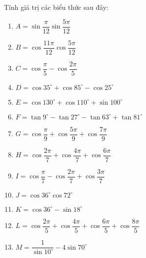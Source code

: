 \begin{bt}%
	Tính giá trị các biểu thức sau đây:
	\begin{multicols}{2}
		\begin{enumerate}
			\item $A=\sin \dfrac{\pi}{12}\sin \dfrac{5\pi}{12}$
			\item $B=\cos \dfrac{11\pi}{12}\cos \dfrac{5\pi}{12}$
			\item $C=\cos \dfrac{\pi}{5}-\cos \dfrac{2\pi}{5}$
			\item $D=\cos 35^\circ+\cos 85^\circ-\cos 25^\circ$
			\item $E=\cos 130^\circ+\cos 110^\circ+\sin 100^\circ$
			\item $F=\tan 9^\circ-\tan 27^\circ-\tan 63^\circ+\tan 81^\circ$
			\item $G=\cos \dfrac{\pi}{9}+\cos \dfrac{5\pi}{9}+\cos \dfrac{7\pi}{9}$
			\item $H=\cos \dfrac{2\pi}{7}+\cos \dfrac{4\pi}{7}+\cos \dfrac{6\pi}{7}$
			\item $I=\cos \dfrac{\pi}{7}-\cos \dfrac{2\pi}{7}+\cos \dfrac{3\pi}{7}$
			\item $J=\cos 36^\circ\cos 72^\circ$
			\item $K=\cos 36^\circ-\sin 18^\circ$
			\item $L=\cos \dfrac{2\pi}{5}+\cos \dfrac{4\pi}{5}+\cos \dfrac{6\pi}{5}+\cos \dfrac{8\pi}{5}$
			\item $M=\dfrac{1}{\sin 10^\circ}-4\sin 70^\circ$
		\end{enumerate}
	\end{multicols}
\end{bt}
